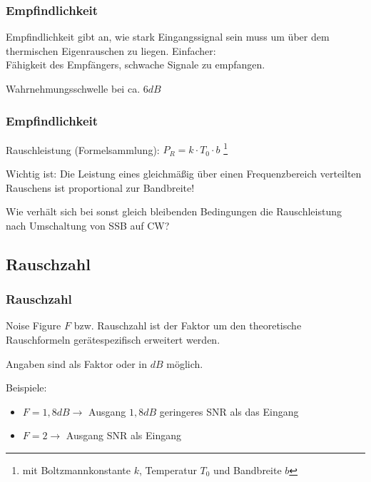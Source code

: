 \begin{frame}
    \frametitle{Empfindlichkeit}

    Empfindlichkeit gibt an, wie stark Eingangssignal sein muss um über dem
    thermischen Eigenrauschen zu liegen. Einfacher: \\

    Fähigkeit des Empfängers, schwache Signale zu empfangen.

    \bigskip

    Wahrnehmungsschwelle bei ca. $6 dB$

\end{frame}

\begin{frame}
    \frametitle{Empfindlichkeit}

    Rauschleistung (Formelsammlung): $P_R = k \cdot T_0 \cdot b$
    \footnote{mit Boltzmannkonstante $k$, Temperatur $T_0$ und Bandbreite $b$}

    \bigskip

    Wichtig ist: Die Leistung eines gleichmäßig über einen Frequenzbereich
    verteilten Rauschens ist proportional zur Bandbreite!

    \bigskip

    \begin{block}{Wie verhält sich bei sonst gleich bleibenden Bedingungen die
                  Rauschleistung nach Umschaltung von SSB auf CW?}
    \end{block}

\end{frame}

\subsection{Rauschzahl}

\begin{frame}
    \frametitle{Rauschzahl}

    Noise Figure $F$ bzw. Rauschzahl ist der Faktor um den theoretische
    Rauschformeln gerätespezifisch erweitert werden.

    \bigskip

    Angaben sind als Faktor oder in $dB$ möglich.

    \bigskip

    Beispiele:

    \begin{itemize}
        \item $F=1,8 dB \rightarrow$ Ausgang $1,8dB$ geringeres SNR als das Eingang
        \item $F=2 \rightarrow$ Ausgang   SNR als Eingang
    \end{itemize}

\end{frame}

